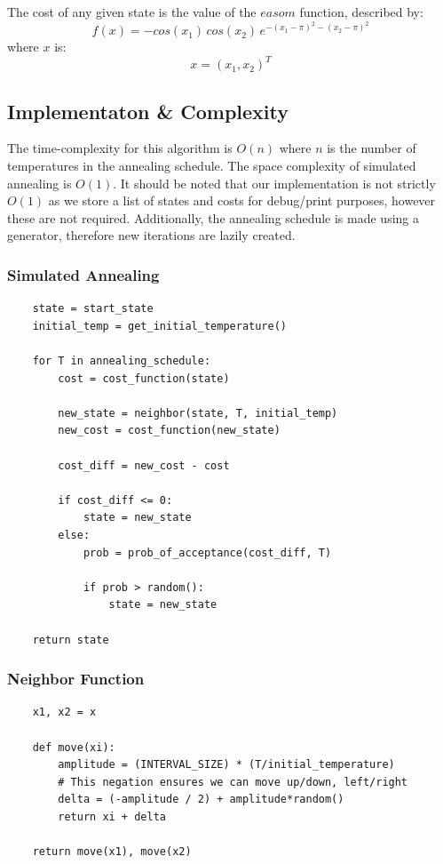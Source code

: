 \documentclass{article}
\begin{document}
The cost of any given state is the value of the $easom$ function, described by:
\[f(x) = -cos(x_1)\,cos(x_2)\,e^{-(x_1 - \pi)^2 - (x_2 - \pi)^2}\]
where $x$ is:
\[x = (x_1, x_2)^T\]

\subsection{Implementaton \& Complexity}
The time-complexity for this algorithm is $O(n)$ where $n$ is the number of temperatures in the annealing schedule. The space complexity of simulated annealing is $O(1)$. It should be noted that our implementation is not strictly $O(1)$ as we store a list of states and costs for debug/print purposes, however these are not required. Additionally, the annealing schedule is made using a generator, therefore new iterations are lazily created.
\subsubsection{Simulated Annealing}

\begin{lstlisting}
    state = start_state
    initial_temp = get_initial_temperature()

    for T in annealing_schedule:
        cost = cost_function(state)

        new_state = neighbor(state, T, initial_temp)
        new_cost = cost_function(new_state)

        cost_diff = new_cost - cost

        if cost_diff <= 0:
            state = new_state
        else:
            prob = prob_of_acceptance(cost_diff, T)

            if prob > random():
                state = new_state

    return state
\end{lstlisting}

\subsubsection{Neighbor Function}

\begin{lstlisting}
    x1, x2 = x

    def move(xi):
        amplitude = (INTERVAL_SIZE) * (T/initial_temperature)
        # This negation ensures we can move up/down, left/right
        delta = (-amplitude / 2) + amplitude*random() 
        return xi + delta

    return move(x1), move(x2)
\end{lstlisting}
\end{document}
